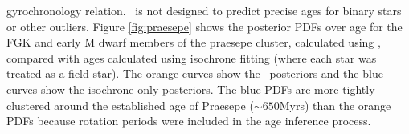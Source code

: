 gyrochronology relation.
\sd\ is not designed to predict precise ages for binary stars or other
outliers.
Figure \ref{fig:praesepe} shows the posterior PDFs over age for the FGK and
early M dwarf members of the praesepe cluster, calculated using \sd, compared
with ages calculated using isochrone fitting (where each star was treated as a
field star).
The orange curves show the \sd\ posteriors and the blue curves show the
isochrone-only posteriors.
The blue PDFs are more tightly clustered around the established age of
Praesepe ($\sim650$Myrs) than the orange PDFs because rotation periods were
included in the age inference process.



